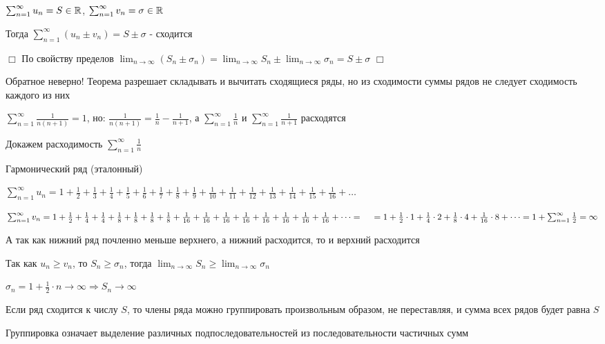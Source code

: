 \documentclass[12pt]{article}
\begin{document}
    \begin{MyTheorem}
         $\sum_{n = 1}^\infty u_n = S \in \mathbb{R}$, $\sum_{n = 1}^\infty v_n = \sigma \in \mathbb{R}$

        Тогда $\sum_{n = 1}^\infty (u_n \pm v_n) = S \pm \sigma$ - сходится
    \end{MyTheorem}

    \begin{tcolorbox}
        $\Box$ По свойству пределов $\lim_{n \to\infty} (S_n \pm \sigma_n) = \lim_{n \to\infty} S_n \pm \lim_{n \to\infty} \sigma_n = S \pm \sigma$ $\Box$
    \end{tcolorbox}

    \Nota Обратное неверно! Теорема разрешает складывать и вычитать сходящиеся ряды, но из сходимости суммы рядов не следует сходимость каждого из них

    \Exs $\sum_{n = 1}^\infty \frac{1}{n (n + 1)} = 1$, \quad но: $\frac{1}{n (n + 1)} = \frac{1}{n} - \frac{1}{n + 1}$,
    а $\sum_{n = 1}^\infty \frac{1}{n}$ и $\sum_{n = 1}^\infty \frac{1}{n + 1}$ расходятся

    \Nota Докажем расходимость $\sum_{n = 1}^\infty \frac{1}{n}$

    \Exs Гармонический ряд (эталонный)

    $\sum_{n = 1}^\infty u_n = 1 + \frac{1}{2} + \frac{1}{3} + \frac{1}{4} + \frac{1}{5} + \frac{1}{6} + \frac{1}{7} + \frac{1}{8} + \frac{1}{9} + \frac{1}{10} + \frac{1}{11} + \frac{1}{12} + \frac{1}{13} + \frac{1}{14} + \frac{1}{15} + \frac{1}{16} + \dots$

    $\sum_{n = 1}^\infty v_n = 1 + \frac{1}{2} + \frac{1}{4} + \frac{1}{4} + \frac{1}{8} + \frac{1}{8} + \frac{1}{8} + \frac{1}{8} + \frac{1}{16} + \frac{1}{16} + \frac{1}{16} + \frac{1}{16} + \frac{1}{16} + \frac{1}{16} + \frac{1}{16} + \frac{1}{16} + \dots = \\
    \quad = 1 + \frac{1}{2} \cdot 1 + \frac{1}{4} \cdot 2 + \frac{1}{8} \cdot 4 + \frac{1}{16} \cdot 8 + \dots = 1 + \sum_{n = 1}^\infty \frac{1}{2} = \infty$

    А так как нижний ряд почленно меньше верхнего, а нижний расходится, то и верхний расходится

    Так как $u_n \geq v_n$, то $S_n \geq \sigma_n$, тогда $\lim_{n \to\infty} S_n \geq \lim_{n \to\infty} \sigma_n$

    $\sigma_n = 1 + \frac{1}{2} \cdot n \to \infty \Longrightarrow S_n \to \infty$

    \begin{MyTheorem}
         Если ряд сходится к числу $S$, то члены ряда можно группировать произвольным образом, не переставляя, и сумма всех рядов будет равна $S$

        Группировка означает выделение различных подпоследовательностей из последовательности частичных сумм
    \end{MyTheorem}
\end{document}
